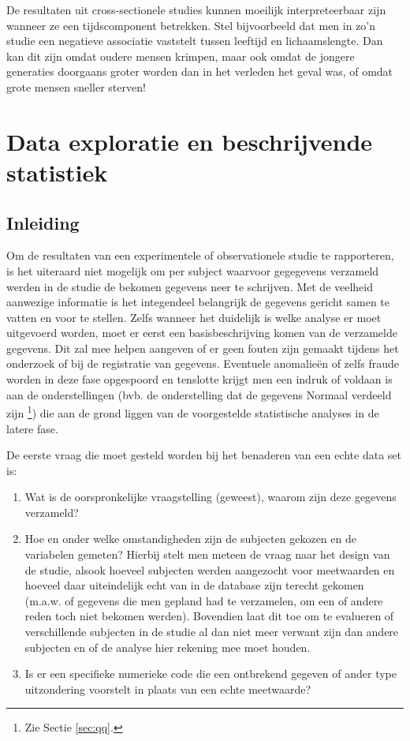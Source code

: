 \documentclass[12pt,dutch,coursenotes]{book}
\providecommand{\tightlist}{%
  \setlength{\itemsep}{0pt}\setlength{\parskip}{0pt}}
\let\rmarkdownfootnote\footnote%
\def\footnote{\protect\rmarkdownfootnote}
\theoremstyle{definition}
\theoremstyle{definition}
\theoremstyle{definition}
\theoremstyle{remark}
\begin{document}
De resultaten uit cross-sectionele studies kunnen moeilijk
interpreteerbaar zijn wanneer ze een tijdscomponent betrekken. Stel
bijvoorbeeld dat men in zo'n studie een negatieve associatie vaststelt
tussen leeftijd en lichaamslengte. Dan kan dit zijn omdat oudere mensen
krimpen, maar ook omdat de jongere generaties doorgaans groter worden
dan in het verleden het geval was, of omdat grote mensen sneller
sterven!

\chapter{Data exploratie en beschrijvende
statistiek}\label{chap:describe}

\section{Inleiding}\label{inleiding-2}

Om de resultaten van een experimentele of observationele studie te
rapporteren, is het uiteraard niet mogelijk om per subject waarvoor
gegegevens verzameld werden in de studie de bekomen gegevens neer te
schrijven. Met de veelheid aanwezige informatie is het integendeel
belangrijk de gegevens gericht samen te vatten en voor te stellen. Zelfs
wanneer het duidelijk is welke analyse er moet uitgevoerd worden, moet
er eerst een basisbeschrijving komen van de verzamelde gegevens. Dit zal
mee helpen aangeven of er geen fouten zijn gemaakt tijdens het onderzoek
of bij de registratie van gegevens. Eventuele anomalieën of zelfs fraude
worden in deze fase opgespoord en tenslotte krijgt men een indruk of
voldaan is aan de onderstellingen (bvb. de onderstelling dat de gegevens
Normaal verdeeld zijn \footnote{Zie Sectie \ref{sec:qq}.}) die aan de
grond liggen van de voorgestelde statistische analyses in de latere
fase.

De eerste vraag die moet gesteld worden bij het benaderen van een echte
data set is:

\begin{enumerate}
\def\labelenumi{\arabic{enumi}.}
\tightlist
\item
  Wat is de oorspronkelijke vraagstelling (geweest), waarom zijn deze
  gegevens verzameld?
\item
  Hoe en onder welke omstandigheden zijn de subjecten gekozen en de
  variabelen gemeten? Hierbij stelt men meteen de vraag naar het design
  van de studie, alsook hoeveel subjecten werden aangezocht voor
  meetwaarden en hoeveel daar uiteindelijk echt van in de database zijn
  terecht gekomen (m.a.w. of gegevens die men gepland had te verzamelen,
  om een of andere reden toch niet bekomen werden). Bovendien laat dit
  toe om te evalueren of verschillende subjecten in de studie al dan
  niet meer verwant zijn dan andere subjecten en of de analyse hier
  rekening mee moet houden.
\item
  Is er een specifieke numerieke code die een ontbrekend gegeven of
  ander type uitzondering voorstelt in plaats van een echte meetwaarde?
\end{enumerate}
\end{document}
